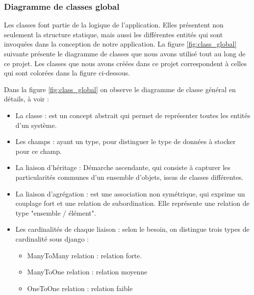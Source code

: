 \subsubsection{	Diagramme de classes global}
\hspace{4mm}Les classes font partie de la logique de l’application. Elles présentent non seulement la structure statique, mais aussi les différentes entités qui sont invoquées dans la conception de notre application. La figure \ref{fig:class_global} suivante présente le diagramme de classes que nous avons utilisé tout au long de ce projet. Les classes que nous avons créées dans ce projet correspondent à celles qui sont colorées dans la figure ci-dessous.
\par Dans la figure \ref{fig:class_global} on observe le diagramme de classe général en détails, à voir :
\begin{itemize}
    \item 	La classe : est un concept abstrait qui permet de représenter toutes les entités d'un système.
    \item	Les champs : ayant un type, pour distinguer le type de données à stocker pour ce champ.
    \item	La liaison d’héritage : Démarche ascendante, qui consiste à capturer les particularités communes d'un ensemble d'objets, issus de classes différentes.
    \item	La liaison d’agrégation : est une association non symétrique, qui exprime un couplage fort et une relation de subordination. Elle représente une relation de type "ensemble / élément".
    \item 	Les cardinalités de chaque liaison : selon le besoin, on distingue trois types de cardinalité sous django : 
    \begin{itemize}
        \item  ManyToMany relation : relation forte.
        \item  ManyToOne relation : relation moyenne
        \item  OneToOne relation : relation faible
    \end{itemize}
\end{itemize}


